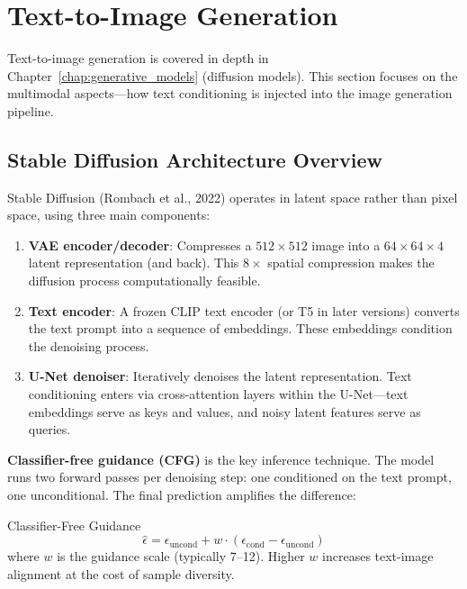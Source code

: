 \section{Text-to-Image Generation}
\label{sec:text_to_image}

Text-to-image generation is covered in depth in Chapter~\ref{chap:generative_models} (diffusion models). This section focuses on the multimodal aspects---how text conditioning is injected into the image generation pipeline.

\subsection{Stable Diffusion Architecture Overview}

Stable Diffusion (Rombach et al., 2022) operates in latent space rather than pixel space, using three main components:

\begin{enumerate}
    \item \textbf{VAE encoder/decoder}: Compresses a $512 \times 512$ image into a $64 \times 64 \times 4$ latent representation (and back). This $8\times$ spatial compression makes the diffusion process computationally feasible.

    \item \textbf{Text encoder}: A frozen CLIP text encoder (or T5 in later versions) converts the text prompt into a sequence of embeddings. These embeddings condition the denoising process.

    \item \textbf{U-Net denoiser}: Iteratively denoises the latent representation. Text conditioning enters via cross-attention layers within the U-Net---text embeddings serve as keys and values, and noisy latent features serve as queries.
\end{enumerate}

\textbf{Classifier-free guidance (CFG)} is the key inference technique. The model runs two forward passes per denoising step: one conditioned on the text prompt, one unconditional. The final prediction amplifies the difference:

\begin{mathresult}{Classifier-Free Guidance}
\begin{equation}
\hat{\epsilon} = \epsilon_{\text{uncond}} + w \cdot (\epsilon_{\text{cond}} - \epsilon_{\text{uncond}})
\end{equation}
where $w$ is the guidance scale (typically 7--12). Higher $w$ increases text-image alignment at the cost of sample diversity.
\end{mathresult}

